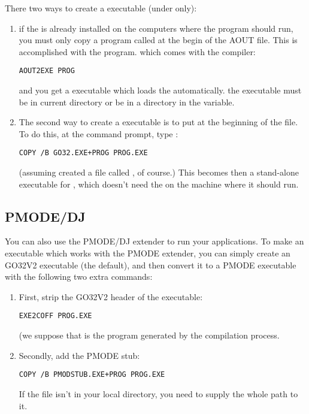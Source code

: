 There two ways to create a \dos executable (under \dos only):
\begin{enumerate}
\item if the  is already
installed on the computers where the program should run, you must
only copy a program called  at the begin of
the AOUT file. This is accomplished with the  program.
which comes with the compiler:
\begin{verbatim}
AOUT2EXE PROG
\end{verbatim}
and you get a \dos executable which loads the  automatically.
the  executable must be in current directory or be
in a directory in the  variable.
\item
The second way to create a \dos executable is to put
 at the beginning of the  file. To do this, at the
command prompt, type :
\begin{verbatim}
COPY /B GO32.EXE+PROG PROG.EXE
\end{verbatim}
(assuming \fpc created a file called , of course.)
This becomes then a stand-alone executable for \dos, which doesn't need the
 on the machine where it should run.
\end{enumerate}

%
%

\subsection{PMODE/DJ}
You can also use the PMODE/DJ extender to run your \fpc applications.
To make an executable which works with the PMODE extender, you can simply
create an GO32V2 executable (the default), and then convert it to a PMODE
executable with the following two extra commands:
\begin{enumerate}
\item First, strip the GO32V2 header of the executable:
\begin{verbatim}
EXE2COFF PROG.EXE
\end{verbatim}
(we suppose that  is the program generated by the compilation
process.
\item Secondly, add the PMODE stub:
\begin{verbatim}
COPY /B PMODSTUB.EXE+PROG PROG.EXE
\end{verbatim}
If the  file isn't in your local directory, you need to
supply the whole path to it.
\end{enumerate}

